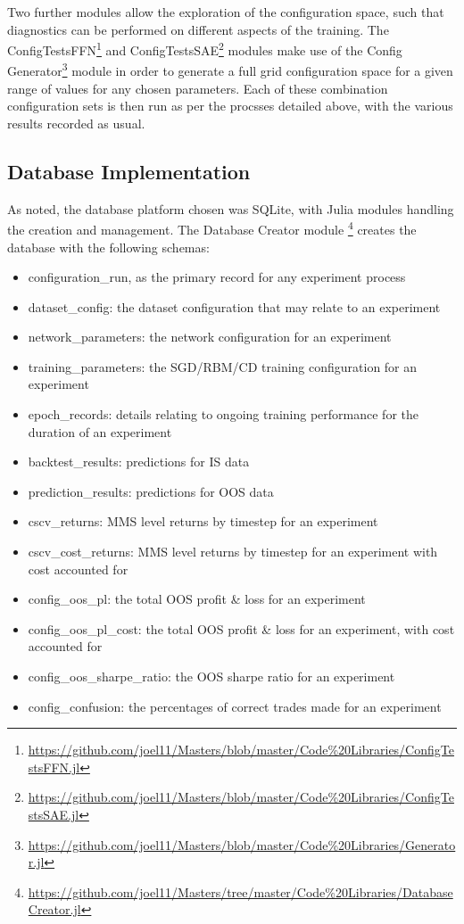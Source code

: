 \documentclass[a4paper,11pt,oneside]{article}
\theoremstyle{plain}
\theoremstyle{definition}
\begin{document}
Two further modules allow the exploration of the configuration space, such that diagnostics can be performed on different aspects of the training. 	The ConfigTestsFFN\footnote{\url{https://github.com/joel11/Masters/blob/master/Code\%20Libraries/ConfigTestsFFN.jl}} and ConfigTestsSAE\footnote{\url{https://github.com/joel11/Masters/blob/master/Code\%20Libraries/ConfigTestsSAE.jl}} modules make use of the Config Generator\footnote{\url{https://github.com/joel11/Masters/blob/master/Code\%20Libraries/Generator.jl}} module in order to generate a full grid configuration space for a given range of values for any chosen parameters. Each of these combination configuration sets is then run as per the procsses detailed above, with the various results recorded as usual. 

\subsection{Database Implementation}

As noted, the database platform chosen was SQLite, with Julia modules handling the creation and management. The Database Creator module \footnote{\url{https://github.com/joel11/Masters/tree/master/Code\%20Libraries/DatabaseCreator.jl}} creates the database with the following schemas:

\begin{itemize}
	\item[1] configuration\_run, as the primary record for any experiment process
	\item[2] dataset\_config: the dataset configuration that may relate to an experiment
	\item[3] network\_parameters: the network configuration for an experiment
	\item[4] training\_parameters: the SGD/RBM/CD training configuration for an experiment
	\item[5] epoch\_records: details relating to ongoing training performance for the duration of an experiment
	\item[6] backtest\_results: predictions for IS data
	\item[7] prediction\_results: predictions for OOS data
	\item[8] cscv\_returns: MMS level returns by timestep for an experiment
	\item[9] cscv\_cost\_returns: MMS level returns by timestep for an experiment with cost accounted for 
	\item[10] config\_oos\_pl: the total OOS profit \& loss for an experiment
	\item[11] config\_oos\_pl\_cost: the total OOS profit \& loss for an experiment, with cost accounted for
	\item[12] config\_oos\_sharpe\_ratio: the OOS sharpe ratio for an experiment
	\item[13] config\_confusion: the percentages of correct trades made for an experiment
\end{itemize}
	
\end{document}
